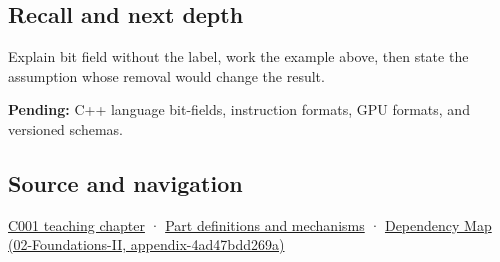 \subsection{Recall and next depth}\label{appendix-ac697f5c66e8-recall-and-next-depth}

Explain bit field without the label, work the example above, then state the assumption whose removal would change the result.

\textbf{Pending:} C++ language bit-fields, instruction formats, GPU formats, and versioned schemas.

\subsection{Source and navigation}\label{appendix-ac697f5c66e8-source-and-navigation}

\hyperref[01-foundations-i-ch001-from-a-signal-to-an-interpretation]{C001 teaching chapter} · \hyperref[appendix-fd090d982a15]{Part definitions and mechanisms} · \href{../02-Foundations-II/main.pdf\#nameddest=appendix-4ad47bdd269a}{Dependency Map (02-Foundations-II, appendix-4ad47bdd269a)}
